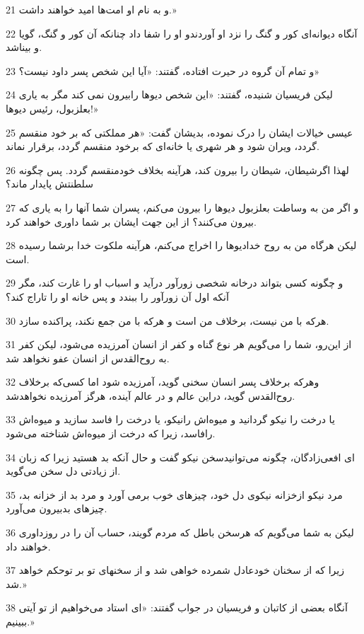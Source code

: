 \par 21 و به نام او امت‌ها امید خواهند داشت.»
\par 22 آنگاه دیوانه‌ای کور و گنگ را نزد او آوردندو او را شفا داد چنانکه آن کور و گنگ، گویا و بیناشد.
\par 23 و تمام آن گروه در حیرت افتاده، گفتند: «آیا این شخص پسر داود نیست؟»
\par 24 لیکن فریسیان شنیده، گفتند: «این شخص دیوها رابیرون نمی کند مگر به یاری بعلزبول، رئیس دیوها!»
\par 25 عیسی خیالات ایشان را درک نموده، بدیشان گفت: «هر مملکتی که بر خود منقسم گردد، ویران شود و هر شهری یا خانه‌ای که برخود منقسم گردد، برقرار نماند.
\par 26 لهذا اگرشیطان، شیطان را بیرون کند، هرآینه بخلاف خودمنقسم گردد. پس چگونه سلطنتش پایدار ماند؟
\par 27 و اگر من به وساطت بعلزبول دیوها را بیرون می‌کنم، پسران شما آنها را به یاری که بیرون می‌کنند؟ از این جهت ایشان بر شما داوری خواهند کرد.
\par 28 لیکن هرگاه من به روح خدادیوها را اخراج می‌کنم، هرآینه ملکوت خدا برشما رسیده است.
\par 29 و چگونه کسی بتواند درخانه شخصی زورآور درآید و اسباب او را غارت کند، مگر آنکه اول آن زورآور را ببندد و پس خانه او را تاراج کند؟
\par 30 هر‌که با من نیست، برخلاف من است و هر‌که با من جمع نکند، پراکنده سازد.
\par 31 از این‌رو، شما را می‌گویم هر نوع گناه و کفر از انسان آمرزیده می‌شود، لیکن کفر به روح‌القدس از انسان عفو نخواهد شد.
\par 32 وهرکه برخلاف پسر انسان سخنی گوید، آمرزیده شود اما کسی‌که برخلاف روح‌القدس گوید، دراین عالم و در عالم آینده، هرگز آمرزیده نخواهدشد.
\par 33 یا درخت را نیکو گردانید و میوه‌اش رانیکو، یا درخت را فاسد سازید و میوه‌اش رافاسد، زیرا که درخت از میوه‌اش شناخته می‌شود.
\par 34 ‌ای افعی‌زادگان، چگونه می‌توانیدسخن نیکو گفت و حال آنکه بد هستید زیرا که زبان از زیادتی دل سخن می‌گوید.
\par 35 مرد نیکو ازخزانه نیکوی دل خود، چیزهای خوب برمی آورد و مرد بد از خزانه بد، چیزهای بدبیرون می‌آورد.
\par 36 لیکن به شما می‌گویم که هرسخن باطل که مردم گویند، حساب آن را در روزداوری خواهند داد.
\par 37 زیرا که از سخنان خودعادل شمرده خواهی شد و از سخنهای تو بر توحکم خواهد شد.»
\par 38 آنگاه بعضی از کاتبان و فریسیان در جواب گفتند: «ای استاد می‌خواهیم از تو آیتی ببینیم.»
